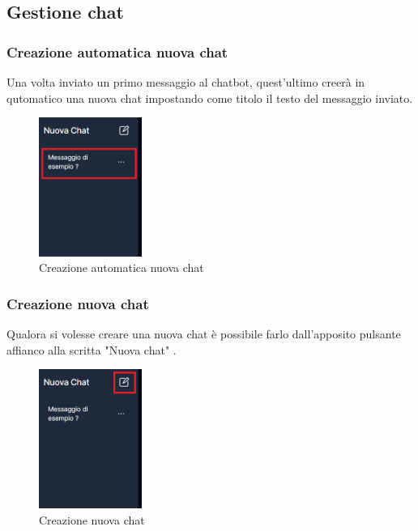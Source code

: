 \newpage
\subsection{Gestione chat}
\subsubsection{Creazione automatica nuova chat}
Una volta inviato un primo messaggio al chatbot, quest'ultimo creerà in qutomatico una nuova chat impostando come titolo il testo del messaggio inviato.
\begin{figure}[h!]
    \centering
    \includegraphics[width=0.3\textwidth]{automaticcreationchat.png}
    \caption{Creazione automatica nuova chat}\label{fig:automaticcreationchat}
\end{figure}

\subsubsection{Creazione nuova chat}
Qualora si volesse creare una nuova chat è possibile farlo dall'apposito pulsante affianco alla scritta "Nuova chat" .
\begin{figure}[h!]
    \centering
    \includegraphics[width=0.3\textwidth]{createnewchat.png}
    \caption{Creazione nuova chat}\label{fig:createnewchat}
\end{figure}
